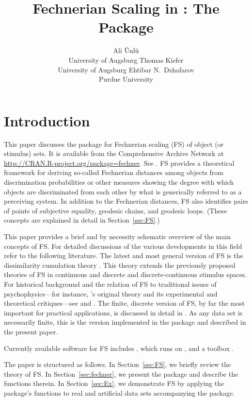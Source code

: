 \documentclass[nojss]{jss}
\author{Ali \"Unl\"u\\University of Augsburg
   \And Thomas Kiefer\\University of Augsburg
   \And Ehtibar N.\ Dzhafarov\\Purdue University}
\title{Fechnerian Scaling in \proglang{R}: The Package \pkg{fechner}}
\begin{document}
\section{Introduction} \label{sec:intro}

This paper discusses the  \citep{R:2009} 
package  for Fechnerian scaling (FS) of object (or stimulus) sets. 
It is available from the Comprehensive  Archive Network at
\url{http://CRAN.R-project.org/package=fechner}. See \cite{Uenlue+Kiefer+Dzhafarov:2009}.
FS provides a theoretical framework for deriving so-called Fechnerian distances
among objects from discrimination probabilities or other measures
showing the degree with which objects are discriminated from each
other by what is generically referred to as a perceiving system. In
addition to the Fechnerian distances, FS also identifies pairs of points of subjective equality, 
geodesic chains, and geodesic loops. (These concepts are explained in detail in Section~\ref{sec:FS}.)

This paper provides a brief and by necessity schematic overview of
the main concepts of FS. For detailed discussions of the various developments
in this field refer to the following literature. The latest and most
general version of FS is the dissimilarity cumulation theory \citep{DzhCol2007, Dzh2008a, Dzh2008b}.
This theory extends the previously proposed theories of FS in continuous
\citep{DzhCol2005a} and discrete and discrete-continuous \citep{DzhCol2005b}
stimulus spaces. For historical background and the relation of FS
to traditional issues of psychophysics---for instance, \cite{Fech1860}'s
original theory and its experimental and theoretical critiques---see
\cite{Dzh2001,Dzh2002a,Dzh2002b} and \cite{DzhCol1999,DzhCol2001}.
The finite, discrete version of FS, by far the most important for
practical applications, is discussed in detail in \cite{DzhCol2006b}.
As any data set is necessarily finite, this is the version implemented
in the package  and described in the present paper.

\pagebreak

Currently available software for FS includes  \citep{FSCAMDS},
which runs on  \citep{MATLAB}, and a  toolbox
\citep{Rach+Colonius:2008}.

The paper is structured as follows. In Section~\ref{sec:FS}, we briefly
review the theory of FS. In Section~\ref{sec:fechner}, we present
the package  and describe the functions therein. In
Section~\ref{sec:Ex}, we demonstrate FS by applying the package's
functions to real and artificial data sets accompanying the package.
\end{document}

